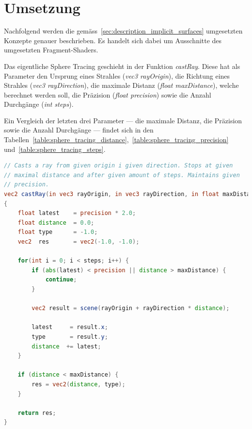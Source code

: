 \section{Umsetzung}
\label{sec:realization}

Nachfolgend werden die
gemäss~\autoref{sec:description_implicit_surfaces} umgesetzten Konzepte
genauer beschrieben. Es handelt sich dabei um Ausschnitte des
umgesetzten Fragment-Shaders.

Das eigentliche Sphere Tracing geschieht in der Funktion
\textit{castRay}.  Diese hat als Parameter den Ursprung eines Strahles
(\textit{vec3 rayOrigin}), die Richtung eines Strahles (\textit{vec3
    rayDirection}), die maximale Distanz (\textit{float maxDistance}),
welche berechnet werden soll, die Präzision (\textit{float precision})
sowie die Anzahl Durchgänge (\textit{int steps}).

Ein Vergleich der letzten drei Parameter --- die maximale Distanz, die
Präzision sowie die Anzahl Durchgänge --- findet sich in den
Tabellen~\ref{table:sphere_tracing_distance},~\ref{table:sphere_tracing_precision}
und~\ref{table:sphere_tracing_steps}.

\begin{lstlisting}[language=GLSL,caption={Umsetzung des Sphere Tracings in
        GLSL.},label={alg:glsl_sphere_tracing},captionpos=b,emph={castRay}]
// Casts a ray from given origin i given direction. Stops at given
// maximal distance and after given amount of steps. Maintains given
// precision.
vec2 castRay(in vec3 rayOrigin, in vec3 rayDirection, in float maxDistance, in float precision, in int steps)
{
    float latest    = precision * 2.0;
    float distance  = 0.0;
    float type      = -1.0;
    vec2  res       = vec2(-1.0, -1.0);

    for(int i = 0; i < steps; i++) {
        if (abs(latest) < precision || distance > maxDistance) {
            continue;
        }

        vec2 result = scene(rayOrigin + rayDirection * distance);

        latest     = result.x;
        type       = result.y;
        distance  += latest;
    }

    if (distance < maxDistance) {
        res = vec2(distance, type);
    }

    return res;
}
\end{lstlisting}

